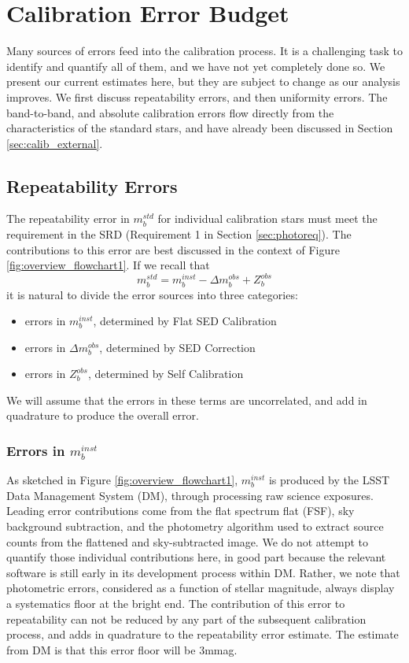 \documentclass[12pt,preprint]{aastex}
\begin{document}
\section{Calibration Error Budget}
\label{sec:error_budget}
Many sources of errors feed into the calibration process.  It is a challenging task to identify and quantify all of them, and we have not yet completely done so.  We present our current estimates here, but they are subject to change as our analysis improves. We first
discuss repeatability errors, and then uniformity errors.   The band-to-band, and absolute calibration errors flow directly from the characteristics of the standard stars, and have already been discussed in Section \ref{sec:calib_external}.
\subsection{Repeatability Errors}
The repeatability error in $m_b^{std}$ for individual calibration stars must meet the requirement in the SRD (Requirement 1 in Section \ref{sec:photoreq}).  The contributions to this error are best discussed in the context of Figure \ref{fig:overview_flowchart1}.  If we recall that
\begin{equation}
m_b^{std} = m_b^{inst} - \Delta m_b^{obs} + Z_b^{obs}
\end{equation}
it is natural to divide the error sources into three categories:

\begin{itemize}
\item{errors in $m_b^{inst}$, determined by Flat SED Calibration}
\item{errors in $\Delta m_b^{obs}$, determined by SED Correction}
\item{errors in $Z_b^{obs}$, determined by Self Calibration}
\end{itemize}

We will assume that the errors in these terms are uncorrelated, and add in quadrature to produce the overall error.

\subsubsection{Errors in $m_b^{inst}$}
As sketched in Figure \ref{fig:overview_flowchart1}, $m_b^{inst}$ is produced by the LSST Data Management System (DM), through processing raw science exposures. Leading error contributions come from the flat spectrum flat (FSF), sky background subtraction, and the photometry algorithm used to extract source counts from the flattened and sky-subtracted image. We do not attempt to quantify those individual contributions here, in good part because the relevant software is still early in its development process within DM. Rather, we note that photometric errors, considered as a function of stellar magnitude, always display a systematics floor at the bright end. The contribution of this error to repeatability can not be reduced by any part of the subsequent calibration process, and adds in quadrature to the repeatability error estimate. The estimate from DM is that this error floor will be 3mmag. 
\end{document}
